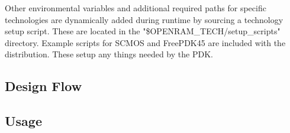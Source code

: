 Other environmental variables and additional required paths for
specific technologies are dynamically added during runtime by sourcing
a technology setup script. These are located in the
"\$OPENRAM\_TECH/setup\_scripts" directory. Example scripts for SCMOS and
FreePDK45 are included with the distribution. These setup any things
needed by the PDK.

\subsection{Design Flow}








\subsection{Usage}

